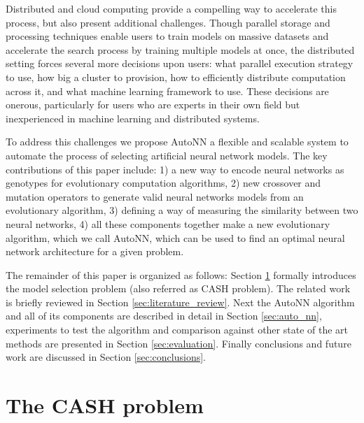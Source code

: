 \documentclass[journal]{IEEEtran}
\begin{document}
Distributed and cloud computing provide a compelling way to accelerate this process, but also present additional challenges. Though parallel storage and processing techniques enable users to train models on massive datasets and accelerate the search process by training multiple models at once, the distributed setting forces several more decisions upon users: what parallel execution strategy to use, how big a cluster to provision, how to efficiently distribute computation across it, and what machine learning framework to use. These decisions are onerous, particularly for users who are experts in their own field but inexperienced in machine learning and distributed systems.

To address this challenges we propose AutoNN a flexible and scalable system to automate the process of selecting artificial neural network models. The key contributions of this paper include: 1) a new way to encode neural networks as genotypes for evolutionary computation algorithms, 2) new crossover and mutation operators to generate valid neural networks models from an evolutionary algorithm, 3) defining a way of measuring the similarity between two neural networks, 4) all these components together make a new evolutionary algorithm, which we call AutoNN, which can be used to find an optimal neural network architecture for a given problem.

The remainder of this paper is organized as follows: Section \ref{sec:model_selection} formally introduces the model selection problem (also referred as CASH problem). The related work is briefly reviewed in Section \ref{sec:literature_review}. Next the AutoNN algorithm and all of its components are described in detail in Section \ref{sec:auto_nn}, experiments to test the algorithm and comparison against other state of the art methods are presented in Section \ref{sec:evaluation}. Finally conclusions and future work are discussed in Section \ref{sec:conclusions}.


\section{The CASH problem}
\label{sec:model_selection}
\end{document}
